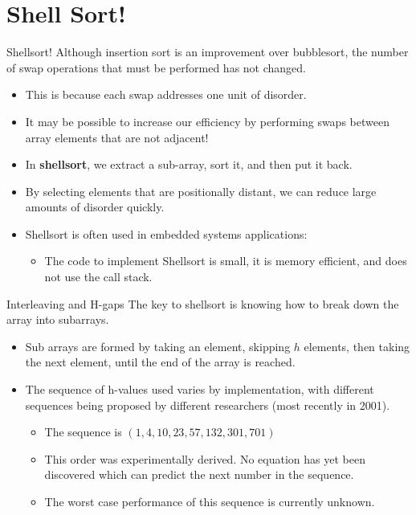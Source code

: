 \documentclass[11pt]{beamer}
\begin{document}
\section[Shell]{Shell Sort!}
\begin{frame}{Shellsort!}
Although insertion sort is an improvement over bubblesort, the number of swap operations that must be performed has not changed.  
\begin{itemize}
\item This is because each swap addresses one unit of disorder.  
\item It may be possible to increase our efficiency by performing swaps between array elements that are not adjacent! 
\item In \textbf{shellsort}, we extract a sub-array, sort it, and then put it back.
\item By selecting elements that are positionally distant, we can reduce large amounts of disorder quickly.
\item Shellsort is often used in embedded systems applications:
\begin{itemize}
\item The code to implement Shellsort is small, it is memory efficient, and does not use the call stack.
\end{itemize}
\end{itemize}
\end{frame}

\begin{frame}{Interleaving and H-gaps}
The key to shellsort is knowing how to break down the array into subarrays.  
\begin{itemize}
\item Sub arrays are formed by taking an element, skipping $h$ elements, then taking the next element, until the end of the array is reached.
\item The sequence of h-values used varies by implementation, with different sequences being proposed by different researchers (most recently in 2001).  
\begin{itemize}
\item The sequence is $(1, 4, 10, 23, 57, 132, 301, 701)$
\item This order was experimentally derived.  No equation has yet been discovered which can predict the next number in the sequence.  
\item The worst case performance of this sequence is currently unknown.  
\end{itemize}
\end{itemize}
\end{frame}
\end{document}
